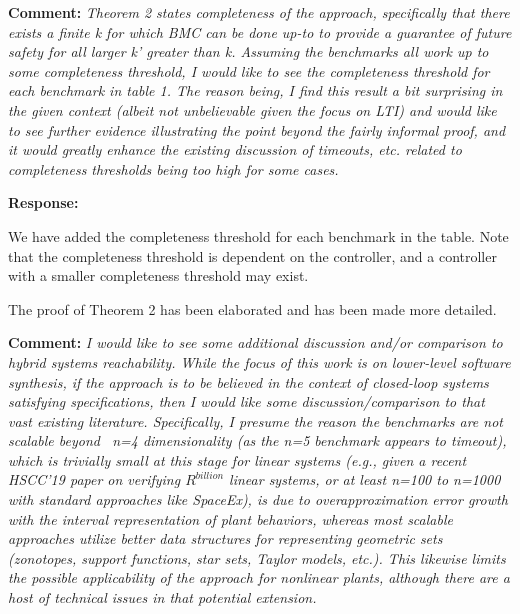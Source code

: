 \documentclass{article}
\begin{document}
\vspace{2em}
{\bf Comment: } {\itshape Theorem 2 states completeness of the approach, specifically that there exists a finite k for which BMC can be done up-to to
provide a guarantee of future safety for all larger k' greater than k. Assuming the benchmarks all work up to some completeness threshold, I would
like to see
the completeness threshold for each benchmark in table 1. The reason being, I find this result a bit surprising in the given context (albeit not
unbelievable given the focus on LTI) and would like to see further evidence illustrating the point beyond the fairly informal proof, and it would
greatly enhance the existing discussion of timeouts, etc. related to completeness thresholds being too high for some cases.}

\vspace{1em}

{\bf Response: }

We have added the completeness threshold for each benchmark in the table. Note that the completeness threshold is dependent on the controller, 
and a controller with a smaller completeness threshold may exist. 

The proof of Theorem 2 has been elaborated and has been made more detailed. 


\vspace{2em}

{\bf Comment: }
{\itshape I would like to see some additional discussion and/or comparison to hybrid systems reachability. While the focus of this work is on
lower-level
software synthesis, if the approach is to be believed in the context of closed-loop systems satisfying specifications, then I would like some
discussion/comparison to that vast existing literature. Specifically, I presume the reason the benchmarks are not scalable beyond ~n=4 dimensionality
(as the n=5 benchmark appears to timeout), which is trivially small at this stage for linear systems (e.g., given a recent HSCC'19 paper on verifying
$R^{billion}$ linear systems, or at least n=100 to n=1000 with standard approaches like SpaceEx), is due to overapproximation error growth with the
interval representation of plant behaviors, whereas most scalable approaches utilize better data structures for representing geometric sets
(zonotopes, support functions, star sets, Taylor models, etc.). This likewise limits the possible applicability of the
approach for nonlinear plants, although there are a host of technical issues in that potential extension. }
\end{document}
